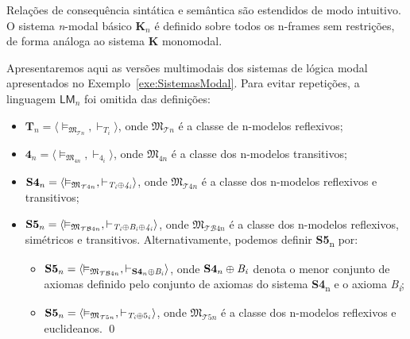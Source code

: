             Relações de consequência sintática e semântica são estendidos de modo intuitivo.
            O sistema \textit{n}-modal básico \(\textbf{K}_n\) é definido sobre todos os n-frames sem restrições, de forma análoga ao sistema \textbf{K} monomodal.

            \begin{exemplo}
                \label{exe:SistemasMultiModal}
                Apresentaremos aqui as versões multimodais dos sistemas de lógica modal apresentados no Exemplo~\ref{exe:SistemasModal}.
                Para evitar repetições, a linguagem \(\mathsf{LM}_{n}\) foi omitida das definições:

                \begin{itemize}
                    \item \(\mathbf{T}_n = \langle \vDash_{\mathfrak{M}_{\mathcal{T}n}}, \vdash_{\mathit{T_i}} \rangle\), onde \(\mathfrak{M}_{\mathcal{T}n}\) é a classe de
                    n-modelos reflexivos;

                    \item \(\mathbf{4}_n = \langle \vDash_{\mathfrak{M}_{4n}}, \vdash_{\mathit{4_i}} \rangle\), onde \(\mathfrak{M}_{4n}\) é a classe dos
                    n-modelos transitivos;

                    \item \(\mathbf{S4}_n = \langle \vDash_{\mathfrak{M}_{\mathcal{T}4n}}, \vdash_{\mathit{T_i}\mathbin{\oplus}\mathit{4_i}} \rangle\), onde \(\mathfrak{M}_{\mathcal{T}4n}\)
                    é a classe dos n-modelos reflexivos e transitivos;

                    \item \(\mathbf{S5}_n = \langle \vDash_{\mathfrak{M}_{\mathcal{TB}4n}}, \vdash_{\mathit{T_i}\mathbin{\oplus}\mathit{B_i}\mathbin{\oplus}\mathit{4_i}} \rangle\),
                    onde \(\mathfrak{M}_{\mathcal{TB}4n}\) é a classe dos n-modelos reflexivos, simétricos e transitivos. Alternativamente, podemos definir \textbf{S5}\textsubscript{n} por:
                    \begin{itemize}
                        \item \(\mathbf{S5}_n = \langle \vDash_{\mathfrak{M}_{\mathcal{TB}4n}}, \vdash_{\mathbf{S4}_n\mathbin{\oplus}\mathit{B_i}} \rangle\), onde
                        \(\mathbf{S4}_n\mathbin{\oplus}\mathit{B_i}\) denota o menor conjunto de axiomas definido pelo conjunto de axiomas do sistema \textbf{S4}\textsubscript{n} e o
                        axioma \textit{B}\textsubscript{\textit{i}};

                        \item \(\mathbf{S5}_n = \langle \vDash_{\mathfrak{M}_{\mathcal{T}5n}}, \vdash_{\mathit{T_i}\mathbin{\oplus} 5_i} \rangle\), onde \(\mathfrak{M}_{\mathcal{T}5n}\)
                        é a classe dos n-modelos reflexivos e euclideanos. \qed
                    \end{itemize}
                \end{itemize}
            \end{exemplo}

